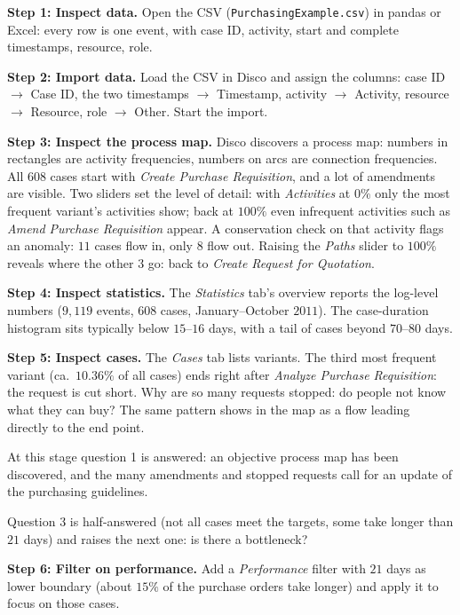 \textbf{Step 1: Inspect data.} Open the CSV (\texttt{PurchasingExample.csv}) in pandas or Excel: every row is one event, with case ID, activity, start and complete timestamps, resource, role.

\textbf{Step 2: Import data.} Load the CSV in Disco and assign the columns: case ID $\to$ Case ID, the two timestamps $\to$ Timestamp, activity $\to$ Activity, resource $\to$ Resource, role $\to$ Other. Start the import.

\textbf{Step 3: Inspect the process map.} Disco discovers a process map: numbers in rectangles are activity frequencies, numbers on arcs are connection frequencies. All $608$ cases start with \emph{Create Purchase Requisition}, and a lot of amendments are visible. Two sliders set the level of detail: with \emph{Activities} at $0\%$ only the most frequent variant's activities show; back at $100\%$ even infrequent activities such as \emph{Amend Purchase Requisition} appear. A conservation check on that activity flags an anomaly: $11$ cases flow in, only $8$ flow out. Raising the \emph{Paths} slider to $100\%$ reveals where the other $3$ go: back to \emph{Create Request for Quotation}.

\textbf{Step 4: Inspect statistics.} The \emph{Statistics} tab's overview reports the log-level numbers ($9{,}119$ events, $608$ cases, January--October $2011$). The case-duration histogram sits typically below $15$--$16$ days, with a tail of cases beyond $70$--$80$ days.

\textbf{Step 5: Inspect cases.} The \emph{Cases} tab lists variants. The third most frequent variant (ca.\ $10.36\%$ of all cases) ends right after \emph{Analyze Purchase Requisition}: the request is cut short. Why are so many requests stopped: do people not know what they can buy? The same pattern shows in the map as a flow leading directly to the end point.

At this stage question 1 is answered: an objective process map has been discovered, and the many amendments and stopped requests call for an update of the purchasing guidelines.

Question 3 is half-answered (not all cases meet the targets, some take longer than $21$ days) and raises the next one: is there a bottleneck?

\textbf{Step 6: Filter on performance.} Add a \emph{Performance} filter with $21$ days as lower boundary (about $15\%$ of the purchase orders take longer) and apply it to focus on those cases.

